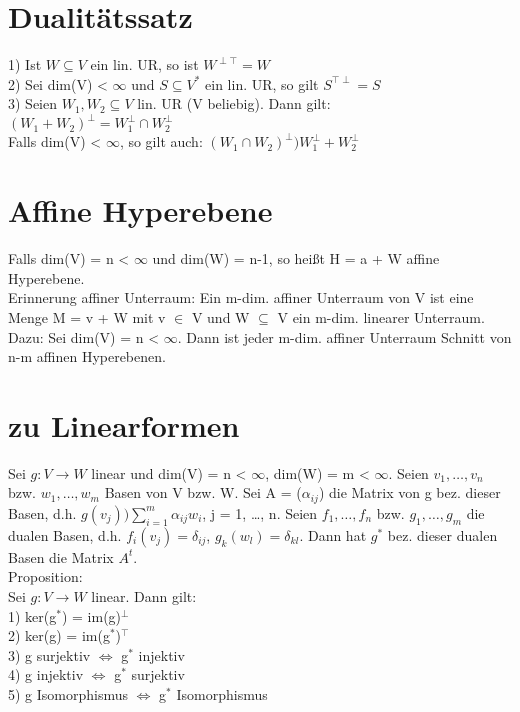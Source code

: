 \documentclass[fontsize=10pt]{scrartcl}
\begin{document}
\section{Dualitätssatz}
1) Ist $W \subseteq V$ ein lin. UR, so ist $W^{\perp \top} = W$\\
2) Sei dim(V) < $\infty$ und $S \subseteq V^*$ ein lin. UR, so gilt  $S^{\top \perp} = S$\\
3) Seien $W_1, W_2 \subseteq V$ lin. UR (V beliebig). Dann gilt:\\
\hspace*{3mm} $(W_1 + W_2)^\perp = W_1^\perp \cap W_2^\perp$\\
\hspace*{3mm} Falls dim(V) < $\infty$, so gilt auch: $(W_1 \cap W_2)^\perp ) W_1^\perp + W_2^\perp$

\section{Affine Hyperebene}
Falls dim(V) = n < $\infty$ und dim(W) = n-1, so heißt H = a + W affine Hyperebene.\\
Erinnerung affiner Unterraum: Ein m-dim. affiner Unterraum von V ist eine Menge M = v + W mit  v $\in$ V und W $\subseteq$ V ein m-dim. linearer Unterraum.\\
Dazu: Sei dim(V) = n < $\infty$. Dann ist jeder m-dim. affiner Unterraum Schnitt von n-m affinen Hyperebenen.

\section{zu Linearformen}
Sei $g: V \to W$ linear und dim(V) = n < $\infty$, dim(W) = m < $\infty$. Seien $v_1, …, v_n$ bzw. $w_1, …, w_m$ Basen von V bzw. W. Sei A = ($\alpha_{ij}$) die Matrix von g bez. dieser Basen, d.h. $g(v_j) ) \sum\limits_{i=1}^m \alpha_{ij} w_i$, j = 1, …, n. Seien $f_1, …, f_n$ bzw. $g_1, …, g_m$ die dualen Basen, d.h. $f_i(v_j) = \delta_{ij}$, $g_k(w_l) = \delta_{kl}$. Dann hat $g^*$ bez. dieser dualen Basen die Matrix $A^t$.\\
Proposition:\\
Sei $g: V \to W$ linear. Dann gilt:\\
1) ker(g$^*$) = im(g)$^\perp$\\
2) ker(g) = im(g$^*$)$^\top$\\
3) g surjektiv $\Leftrightarrow$ g$^*$ injektiv\\
4) g injektiv $\Leftrightarrow$ g$^*$ surjektiv\\
5) g Isomorphismus $\Leftrightarrow$ g$^*$ Isomorphismus
\end{document}
